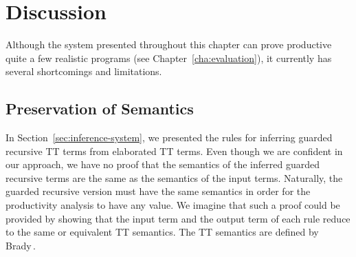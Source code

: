 





\section{Discussion}
Although the system presented throughout this chapter can prove productive quite
a few realistic programs (see Chapter~\ref{cha:evaluation}), it currently has
several shortcomings and limitations.

\subsection{Preservation of Semantics}
In Section~\ref{sec:inference-system}, we presented the rules for inferring
guarded recursive TT terms from elaborated TT terms. Even though we are
confident in our approach, we have no proof that the semantics of the inferred
guarded recursive terms are the same as the semantics of the input
terms. Naturally, the guarded recursive version must have the same semantics in
order for the productivity analysis to have any value. We imagine that such a
proof could be provided by showing that the input term and the output term of each
rule reduce to the same or equivalent TT semantics. The TT
semantics are defined by Brady\,\citep{BradyIdrisImpl13}.

